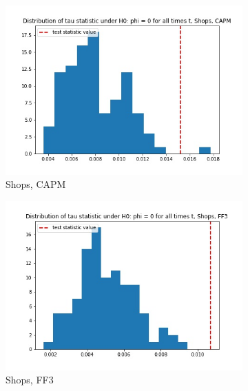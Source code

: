 \documentclass{article}
\begin{document}
  \begin{figure}
  \centering
  \begin{subfigure}[b]{0.3\textwidth}
    \centering
    \includegraphics[width=\textwidth]{Shops/tau_hist_02_CAPM.jpg}
    \caption{Shops, CAPM}
    \label{fig:1}
  \end{subfigure}
  \begin{subfigure}[b]{0.3\textwidth}
    \centering
    \includegraphics[width=\textwidth]{Shops/tau_hist_02_FF3.jpg}
    \caption{Shops, FF3}
    \label{fig:2}
  \end{subfigure}
    \begin{subfigure}[b]{0.3\textwidth}
    \centering

\end{subfigure}
\end{figure}
\end{document}

